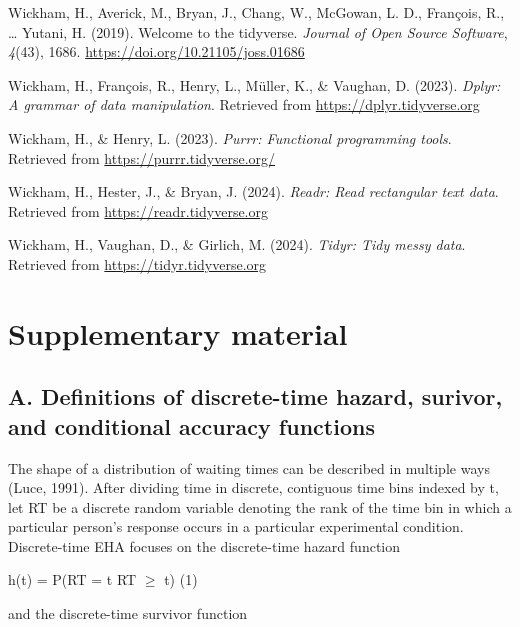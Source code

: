 \documentclass[
  man,floatsintext]{apa6}
\newlength{\cslhangindent}
\newenvironment{CSLReferences}[2] %
 {\begin{list}{}{%
  \setlength{\itemindent}{0pt}
  \setlength{\leftmargin}{0pt}
  \setlength{\parsep}{0pt}
  \ifodd #1
   \setlength{\leftmargin}{\cslhangindent}
   \setlength{\itemindent}{-1\cslhangindent}
  \fi
  \setlength{\itemsep}{#2\baselineskip}}}
 {\end{list}}
\begin{document}
\begin{CSLReferences}{1}{0}
Wickham, H., Averick, M., Bryan, J., Chang, W., McGowan, L. D., François, R., \ldots{} Yutani, H. (2019). Welcome to the {tidyverse}. \emph{Journal of Open Source Software}, \emph{4}(43), 1686. \url{https://doi.org/10.21105/joss.01686}

Wickham, H., François, R., Henry, L., Müller, K., \& Vaughan, D. (2023). \emph{Dplyr: A grammar of data manipulation}. Retrieved from \url{https://dplyr.tidyverse.org}

Wickham, H., \& Henry, L. (2023). \emph{Purrr: Functional programming tools}. Retrieved from \url{https://purrr.tidyverse.org/}

Wickham, H., Hester, J., \& Bryan, J. (2024). \emph{Readr: Read rectangular text data}. Retrieved from \url{https://readr.tidyverse.org}

Wickham, H., Vaughan, D., \& Girlich, M. (2024). \emph{Tidyr: Tidy messy data}. Retrieved from \url{https://tidyr.tidyverse.org}

\end{CSLReferences}

\newpage

\section{Supplementary material}\label{supplementary-material}

\subsection{A. Definitions of discrete-time hazard, surivor, and conditional accuracy functions}\label{a.-definitions-of-discrete-time-hazard-surivor-and-conditional-accuracy-functions}

The shape of a distribution of waiting times can be described in multiple ways (Luce, 1991). After dividing time in discrete, contiguous time bins indexed by t, let RT be a discrete random variable denoting the rank of the time bin in which a particular person's response occurs in a particular experimental condition.
Discrete-time EHA focuses on the discrete-time hazard function

\noindent h(t) = P(RT = t\textbar{} RT \(\geq\) t) \hfill  (1)

\noindent and the discrete-time survivor function
\end{document}
